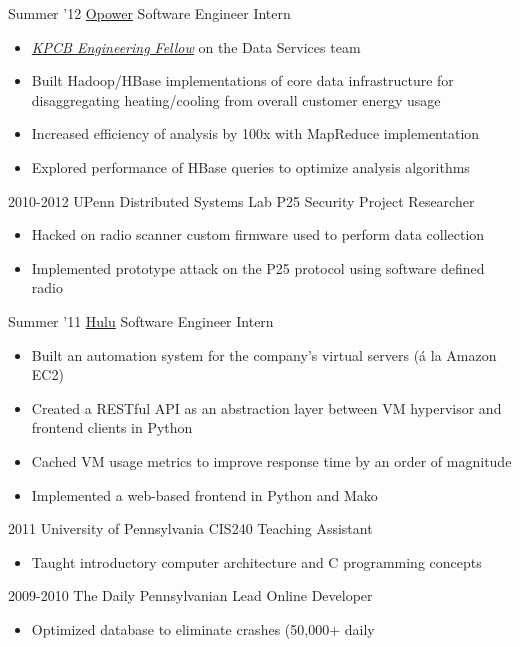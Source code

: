 \documentclass[]{friggeri-cv}
\begin{document}
\begin{entrylist}
  \entry
  {Summer '12}
  {\href{http://opower.com/}{Opower}}
  {Software Engineer Intern}
  {\begin{itemize}
    \item \href{http://kpcbfellows.com/}{\emph{KPCB Engineering
          Fellow}} on the Data Services team
    \item Built Hadoop/HBase implementations of core data
      infrastructure for disaggregating heating/cooling from overall
      customer energy usage
    \item Increased efficiency of analysis by 100x
      with MapReduce implementation
    \item Explored performance of HBase queries to optimize analysis
      algorithms
    \end{itemize}}
  \entry
  {2010-2012}
  {UPenn Distributed Systems Lab}
  {P25 Security Project Researcher}
  {\begin{itemize}
    \item Hacked on radio scanner custom firmware used to perform
      data collection
    \item Implemented prototype attack on the P25 protocol using
      software defined radio
    \end{itemize}}
  \entry
  {Summer '11}
  {\href{http://hulu.com}{Hulu}}
  {Software Engineer Intern}
  {\begin{itemize}
    \item Built an automation system for the company’s virtual servers
      (\'{a} la Amazon EC2)
    \item Created a RESTful API as an abstraction layer between VM
      hypervisor and frontend clients in Python
    \item Cached VM usage metrics to improve response time by an order
      of magnitude
    \item Implemented a web-based frontend in Python and Mako
    \end{itemize}}
  \entry
  {2011}
  {University of Pennsylvania}
  {CIS240 Teaching Assistant}
  {\begin{itemize}
    \item Taught introductory computer architecture and C
      programming concepts
    \end{itemize}}
  \entry
  {2009-2010}
  {The Daily Pennsylvanian}
  {Lead Online Developer}
  {\begin{itemize}
    \item Optimized database to eliminate crashes (50,000+ daily

\end{itemize}}
\end{entrylist}
\end{document}
